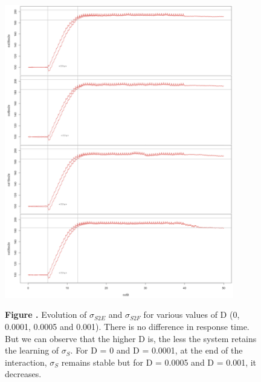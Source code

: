 \documentclass{report}
\begin{document}
\begin{figure}[h!]
\begin{center}
\includegraphics[width=10cm]{figures/varying_D-ss2.png}
\end{center}
 \textbf{\label{fig:05} Figure . }{Evolution of $\sigma_{S2E}$ and $\sigma_{S2F}$  for various values of D (0, 0.0001, 0.0005 and 0.001). There is no difference in response time. But we can observe that the higher D is, the less the system retains the learning of $\sigma_S$. For D = 0 and D = 0.0001, at the end of the interaction, $\sigma_S$ remains stable but for D = 0.0005 and D = 0.001, it decreases.}
\end{figure}
\end{document}
